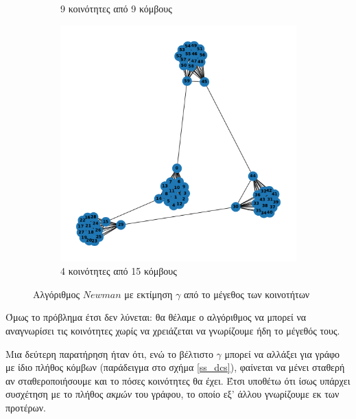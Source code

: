 \documentclass[12pt, letterpaper]{article}
\begin{document}
\begin{figure}[h]
\begin{subfigure}{0.3\textwidth}
      \caption{9 κοινότητες από 9 κόμβους}
      \label{9b}
  \end{subfigure}
  \begin{subfigure}{0.3\textwidth}
      \includegraphics[width=\textwidth]{cluster_4,15newman_auto.pdf}
      \caption{4 κοινότητες από 15 κόμβους}
      \label{9c}
  \end{subfigure}
  \caption{Αλγόριθμος $Newman$ με εκτίμηση $\gamma$ από το μέγεθος των κοινοτήτων}
  \label{auto_cluster_size}
\end{figure}







Όμως το πρόβλημα έτσι δεν λύνεται: θα θέλαμε ο αλγόριθμος να μπορεί να αναγνωρίσει 
τις κοινότητες χωρίς να χρειάζεται να γνωρίζουμε ήδη το μέγεθός τους. 


Μια δεύτερη παρατήρηση ήταν ότι, ενώ το βέλτιστο $\gamma$ μπορεί να αλλάξει για γράφο 
με ίδιο πλήθος κόμβων (παράδειγμα στο σχήμα \ref{ss_dcs}), φαίνεται να μένει σταθερή αν σταθεροποιήσουμε και το πόσες 
κοινότητες θα έχει. Έτσι υποθέτω ότι ίσως υπάρχει συσχέτηση με το πλήθος \emph{ακμών} του γράφου,
το οποίο εξ' άλλου γνωρίζουμε εκ των προτέρων. 
\end{document}
